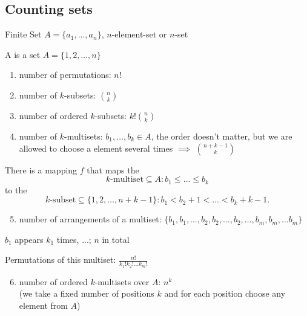 

\subsection{Counting sets}
Finite Set $A = \{a_1, \ldots, a_n\}$, $n$-element-set or $n$-set

A  is a set $A = \{1, 2, \ldots, n\}$

\begin{enumerate}
  \item number of permutations: $n!$
  \item number of $k$-subsets: ${n\choose k}$
  \item number of ordered $k$-subsets: $k! {n\choose k}$
  \item number of $k$-multisets: $b_1, \ldots, b_k \in A$, the order doesn't matter, but we are allowed to choose a element several times $\implies$ ${n +k-1 \choose k}$
\end{enumerate}

There is a mapping $f$ that maps the
\[
  \text{$k$-multiset}
  \subseteq A:
  b_1 ≤ \ldots ≤ b_k
\]
to the
\[
  \text{$k$-subset}
  \subseteq \{1,2,\ldots,n+k-1\}:
  b_1 < b_2+1 < \ldots < b_k+k-1.
\]

\begin{enumerate}
  \setcounter{enumi}{4}
  \item number of arrangements of a multiset: $\{b_1, b_1, \ldots , b_2, b_2,\ldots, b_2, \ldots, b_m, b_m, \ldots b_m\}$
\end{enumerate}

$b_1$ appears $k_1$ times, ...; $n$ in total

Permutations of this multiset:
$\frac{n!}{k_1! k_2! \ldots k_m!}$

\begin{enumerate}
  \setcounter{enumi}{5}
  \item number of ordered $k$-multisets over $A$: $n^k$ \\
  (we take a fixed number of positions $k$ and for each position choose any element from $A$)
\end{enumerate}

